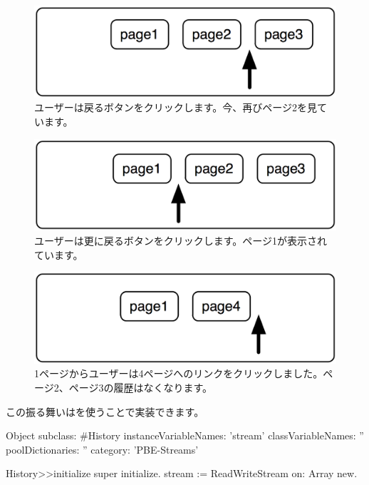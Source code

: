 \documentclass[a4paper,10pt,twoside]{book}
\begin{document}
\begin{figure}[!ht]
\centerline{\includegraphics[scale=0.5]{page2_Stef}}
\caption{ユーザーは戻るボタンをクリックします。今、再びページ2を見ています。}
\vspace{.2in}
\end{figure}

\begin{figure}[!ht]
\centerline{\includegraphics[scale=0.5]{page1_Stef}}
\caption{ユーザーは更に戻るボタンをクリックします。ページ1が表示されています。}
\vspace{.2in}
\end{figure}

\begin{figure}[!ht]
\centerline{\includegraphics[scale=0.5]{page4Stef}}
\caption{1ページからユーザーは4ページへのリンクをクリックしました。ページ2、ページ3の履歴はなくなります。}
\vspace{.2in}
\end{figure}

この振る舞いはを使うことで実装できます。

\begin{code}{}
Object subclass: #History
  instanceVariableNames: 'stream'
  classVariableNames: ''
  poolDictionaries: ''
  category: 'PBE-Streams'

History>>initialize
    super initialize.
    stream := ReadWriteStream on: Array new.
\end{code}
\end{document}
